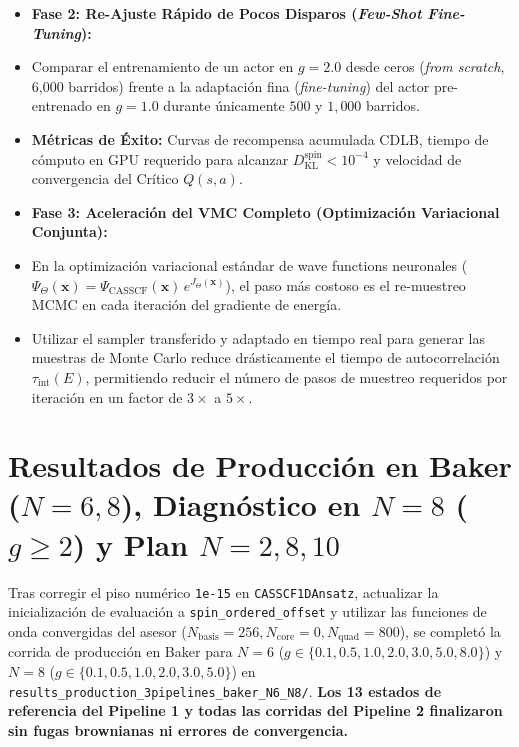 \documentclass[10pt,a4paper]{article}
\begin{document}
\begin{itemize}
\item \textbf{Fase 2: Re-Ajuste Rápido de Pocos Disparos (\textit{Few-Shot Fine-Tuning}):}
\item Comparar el entrenamiento de un actor en $g=2.0$ desde ceros (\textit{from scratch}, 6,000 barridos) frente a la adaptación fina (\textit{fine-tuning}) del actor pre-entrenado en $g=1.0$ durante únicamente $500$ y $1,000$ barridos.
\item \textbf{Métricas de Éxito:} Curvas de recompensa acumulada CDLB, tiempo de cómputo en GPU requerido para alcanzar $D_{\mathrm{KL}}^{\mathrm{spin}} < 10^{-4}$ y velocidad de convergencia del Crítico $Q(s, a)$.
\end{itemize}



\begin{itemize}
\item \textbf{Fase 3: Aceleración del VMC Completo (Optimización Variacional Conjunta):}
\item En la optimización variacional estándar de wave functions neuronales ($\Psi_\Theta(\mathbf{x}) = \Psi_{\mathrm{CASSCF}}(\mathbf{x})\,e^{J_\Theta(\mathbf{x})}$), el paso más costoso es el re-muestreo MCMC en cada iteración del gradiente de energía.
\item Utilizar el sampler transferido y adaptado en tiempo real para generar las muestras de Monte Carlo reduce drásticamente el tiempo de autocorrelación $\tau_{\mathrm{int}}(E)$, permitiendo reducir el número de pasos de muestreo requeridos por iteración en un factor de $3\times$ a $5\times$.
\end{itemize}

\section{\texorpdfstring{Resultados de Producción en Baker ($N=6, 8$), Diagnóstico en $N=8$ ($g \ge 2$) y Plan $N=2, 8, 10$}{Resultados de Produccion en Baker (N=6, 8), Diagnostico N=8 (g >= 2) y Plan N=2, 8, 10}}

Tras corregir el piso numérico \texttt{1e-15} en \texttt{CASSCF1DAnsatz}, actualizar la inicialización de evaluación a \texttt{spin\_ordered\_offset} y utilizar las funciones de onda convergidas del asesor ($N_{\mathrm{basis}}=256, N_{\mathrm{core}}=0, N_{\mathrm{quad}}=800$), se completó la corrida de producción en Baker para $N=6$ ($g \in \{0.1, 0.5, 1.0, 2.0, 3.0, 5.0, 8.0\}$) y $N=8$ ($g \in \{0.1, 0.5, 1.0, 2.0, 3.0, 5.0\}$) en \texttt{results\_production\_3pipelines\_baker\_N6\_N8/}. \textbf{Los 13 estados de referencia del Pipeline 1 y todas las corridas del Pipeline 2 finalizaron sin fugas brownianas ni errores de convergencia.}
\end{document}
